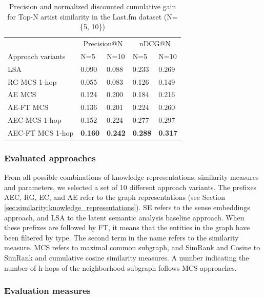 \begin{table}
\small
\centering
	\begin{tabular}{ lllll }
 	\toprule
	& \multicolumn{2}{c}{Precision@N} & \multicolumn{2}{c}{nDCG@N} \\
\cmidrule(lr){2-3}
 \cmidrule(lr){4-5}
	Approach variants & N=5 & N=10 & N=5 & N=10 \\
	\midrule
LSA & 0.090 & 0.088 & 0.233 & 0.269 \\
RG MCS 1-hop & 0.055 & 0.083 & 0.126 & 0.149 \\
AE MCS & 0.124 & 0.200 & 0.184 & 0.216 \\
AE-FT MCS & 0.136 & 0.201 & 0.224 & 0.260 \\
AEC MCS 1-hop & 0.152 & 0.224 & 0.277 & 0.297 \\
AEC-FT MCS 1-hop & \textbf{0.160} & \textbf{0.242} & \textbf{0.288} & \textbf{0.317} \\
\bottomrule
	\end{tabular}
	\caption[Precision and nDCG for Top-N artist similarity in the Last.fm dataset.]{Precision and normalized discounted cumulative gain for Top-N artist similarity in the Last.fm dataset (N=\{5, 10\})}	
	\label{tbl:similarity:res_lastfm}
\end{table}

\subsubsection{Evaluated approaches}\label{sec:similarity:eval_approaches} %

From all possible combinations of knowledge representations, similarity measures and parameters, we selected a set of 10 different approach variants. The prefixes AEC, RG, EC, and AE refer to the graph representations (see Section \ref{sec:similarity:knowledge_representations}). %
SE refers to the sense embeddings approach, and LSA to the latent semantic analysis baseline approach. When these prefixes are followed by FT, it means that the entities in the graph have been filtered by type. The second term in the name refers to the similarity measure. MCS refers to maximal common subgraph, and SimRank and Cosine to SimRank and cumulative cosine similarity measures. A number indicating the number of h-hops of the neighborhood subgraph follows MCS approaches.


\subsubsection{Evaluation measures}

